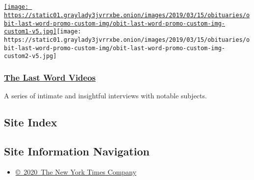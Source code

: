 \subsection{}

\href{https://www.nytimes3xbfgragh.onion/video/last-word}{\texttt{[image: https://static01.graylady3jvrrxbe.onion/images/2019/03/15/obituaries/obit-last-word-promo-custom-img/obit-last-word-promo-custom-img-custom1-v5.jpg]}}\texttt{[image: https://static01.graylady3jvrrxbe.onion/images/2019/03/15/obituaries/obit-last-word-promo-custom-img/obit-last-word-promo-custom-img-custom2-v5.jpg]}

\hypertarget{the-last-word-videos}{%
\subsubsection{\texorpdfstring{\href{https://www.nytimes3xbfgragh.onion/video/last-word}{The
Last Word Videos}}{The Last Word Videos}}\label{the-last-word-videos}}

A series of intimate and insightful interviews with notable subjects.

\hypertarget{site-index}{%
\subsection{Site Index}\label{site-index}}

\hypertarget{site-information-navigation}{%
\subsection{Site Information
Navigation}\label{site-information-navigation}}

\begin{itemize}
\tightlist
\item
  \href{https://help.nytimes3xbfgragh.onion/hc/en-us/articles/115014792127-Copyright-notice}{©~2020~The
  New York Times Company}
\end{itemize}

